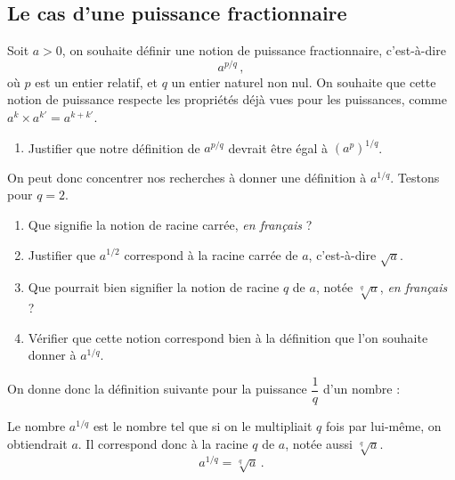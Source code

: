 \documentclass{article}
\begin{document}
\subsection{Le cas d'une puissance fractionnaire}
Soit $a>0$, on souhaite définir une notion de puissance fractionnaire, c'est-à-dire
\begin{equation*}
a^{p/q}\,,    
\end{equation*}
où $p$ est un entier relatif, et $q$ un entier naturel non nul. On souhaite que cette notion de puissance respecte les propriétés déjà vues pour les puissances, comme $a^k \times a^{k'} = a^{k + k'}$.
\begin{enumerate}
\item Justifier que notre définition de $a^{p/q}$ devrait être égal à $(a^p)^{1/q}$.
\end{enumerate}
On peut donc concentrer nos recherches à donner une définition à $a^{1/q}$. Testons pour $q = 2$.
\begin{enumerate}[resume*]
\item Que signifie la notion de racine carrée, \emph{en français} ?
\item Justifier que $a^{1/2}$ correspond à la racine carrée de $a$, c'est-à-dire $\sqrt{a}$.
\item Que pourrait bien signifier la notion de racine $q$\ieme{} de $a$, notée $\sqrt[q]{a}$, \emph{en français} ?
\item Vérifier que cette notion correspond bien à la définition que l'on souhaite donner à $a^{1/q}$.
\end{enumerate}
On donne donc la définition suivante pour la puissance $\dfrac{1}{q}$ d'un nombre : 
\begin{definition}
Le nombre $a^{1/q}$ est le nombre tel que si on le multipliait $q$ fois par lui-même, on obtiendrait $a$. Il correspond donc à la racine $q$\ieme{} de $a$, notée aussi $\sqrt[q]{a}$.
\begin{equation*}
a^{1/q} = \sqrt[q]{a}\,.
\end{equation*}
\end{definition}
\end{document}
